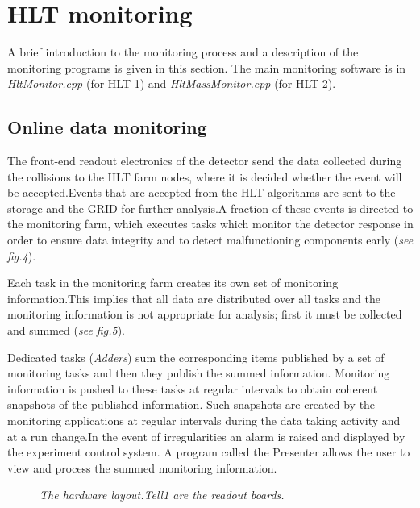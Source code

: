 \section{HLT monitoring}\label{sec:Hlt}
A brief introduction to the monitoring process and a description of the monitoring programs is given in this section. The main monitoring software is in \textit{HltMonitor.cpp} (for HLT 1) and \textit{HltMassMonitor.cpp} (for HLT 2).\par

\subsection{\textbf{Online data monitoring}\cite{Callot:1177133}}
The front-end readout electronics of the detector send the data collected during the collisions to the HLT farm nodes, where it is decided whether the event will be accepted.Events that are accepted from the HLT algorithms are sent to the storage and the GRID for further analysis.A fraction of these events is directed to the monitoring farm, which executes tasks which monitor the detector response in order to ensure data integrity and to detect malfunctioning components early (\textit{see fig.4}).\par
Each task in the monitoring farm creates its own set of monitoring information.This implies that all data are distributed over all tasks and the monitoring information is not appropriate for analysis; first it must be collected and summed (\textit{see fig.5}).\par
Dedicated tasks (\textit{Adders}) sum the corresponding items published by a set of monitoring tasks and then they publish the summed information. Monitoring information is pushed to these tasks at regular intervals to obtain coherent snapshots of the published information. Such snapshots are created by the monitoring 
applications at regular intervals during the data taking activity and at a run change.In the event of irregularities an alarm is raised and displayed by the 
experiment control system. A program called the Presenter allows the user to view and process the summed monitoring information.\par

\begin{figure}
\caption{\textit{The hardware layout.Tell1 are the readout boards.}\cite{Callot:1177133}}
\centering
{}\par
\end{figure}

